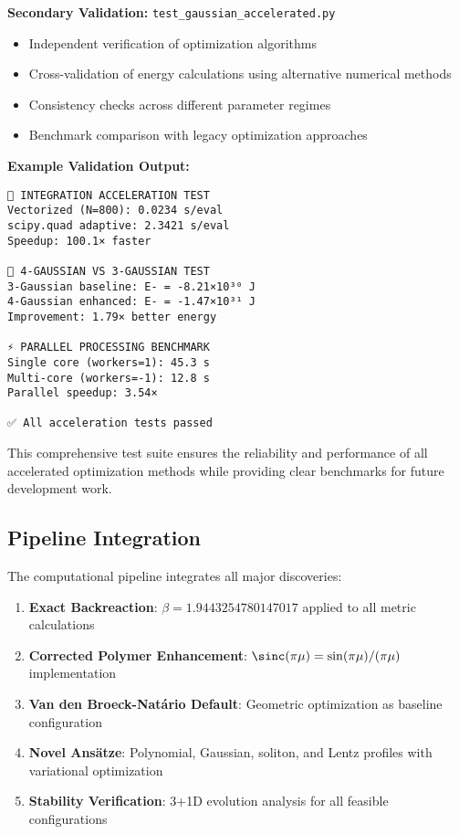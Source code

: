 \documentclass[11pt,a4paper]{article}
\begin{document}
\begin{table}[h]
\textbf{Secondary Validation:} \texttt{test\_gaussian\_accelerated.py}
\begin{itemize}
\item Independent verification of optimization algorithms
\item Cross-validation of energy calculations using alternative numerical methods
\item Consistency checks across different parameter regimes
\item Benchmark comparison with legacy optimization approaches
\end{itemize}

\textbf{Example Validation Output:}
\begin{verbatim}
🔬 INTEGRATION ACCELERATION TEST
Vectorized (N=800): 0.0234 s/eval
scipy.quad adaptive: 2.3421 s/eval
Speedup: 100.1× faster

🧬 4-GAUSSIAN VS 3-GAUSSIAN TEST  
3-Gaussian baseline: E- = -8.21×10³⁰ J
4-Gaussian enhanced: E- = -1.47×10³¹ J
Improvement: 1.79× better energy

⚡ PARALLEL PROCESSING BENCHMARK
Single core (workers=1): 45.3 s
Multi-core (workers=-1): 12.8 s  
Parallel speedup: 3.54×

✅ All acceleration tests passed
\end{verbatim}

This comprehensive test suite ensures the reliability and performance of all accelerated optimization methods while providing clear benchmarks for future development work.

\subsection{Pipeline Integration}

The computational pipeline integrates all major discoveries:
\begin{enumerate}
\item \textbf{Exact Backreaction}: $\beta = 1.9443254780147017$ applied to all metric calculations
\item \textbf{Corrected Polymer Enhancement}: $\sinc(\pi\mu) = \sin(\pi\mu)/(\pi\mu)$ implementation
\item \textbf{Van den Broeck-Natário Default}: Geometric optimization as baseline configuration
\item \textbf{Novel Ansätze}: Polynomial, Gaussian, soliton, and Lentz profiles with variational optimization
\item \textbf{Stability Verification}: 3+1D evolution analysis for all feasible configurations
\end{enumerate}


\end{table}
\end{document}
